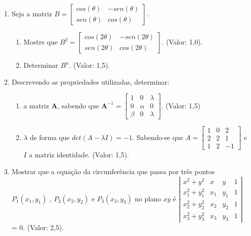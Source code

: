 \documentclass[12pt,a4paper]{article}
\begin{document}
\begin{enumerate}


\item Seja a matriz  
$\displaystyle 
B = \left[\begin{array}{cc}
cos(\theta)&-sen(\theta)\\
sen(\theta)&cos(\theta)
\end{array} \right]
$.

\begin{enumerate}

\item Mostre que  
$\displaystyle 
B^2 = \left[\begin{array}{cc}
cos(2 \theta) & -sen(2 \theta)\\
sen(2 \theta) & cos(2 \theta )
\end{array} \right]
$.  (Valor: 1,0). 

\item Determinar  
$\displaystyle 
B^n 
$.  (Valor: 1,5).
\end{enumerate}

\item Descrevendo as propriedades utilizadas, determinar:

\begin{enumerate}

\item a matriz \textbf{A}, sabendo que   
$\displaystyle 
\textbf{A}^{-1} = \left[\begin{array}{ccc}
1&0&\lambda\\
0&\alpha&0\\
\beta&0&\lambda
\end{array} \right]
$. (Valor: 1,5)

\item
$\displaystyle 
\lambda
$ de forma que 
$\displaystyle 
det(A - \lambda I) = -1
$. Sabendo-se que  
$\displaystyle 
A = \left[\begin{array}{ccc}1&0&2\\2&2&1\\1&2&-1\end{array}\right]
$ e 
$\displaystyle 
I 
$ a matriz identidade. (Valor: 1,5).
\end{enumerate}

\item Mostrar que a equação da circunferência que passa por três pontos
$\displaystyle P_1(x_1, y_1) $
, $\displaystyle P_2(x_2, y_2) $ 
e $\displaystyle P_3(x_3, y_3) $
no plano 
$\displaystyle xy $ é 
$\left|\begin{array}{cccc}
x^2+y^2&x&y&1\\
x_1^2+y_1^2&x_1&y_1&1\\
x_2^2+y_2^2&x_2&y_2&1\\
x_3^2+y_3^2&x_3&y_3&1
\end{array} \right|$
= 0. (Valor: 2,5).


\end{enumerate}
\end{document}
